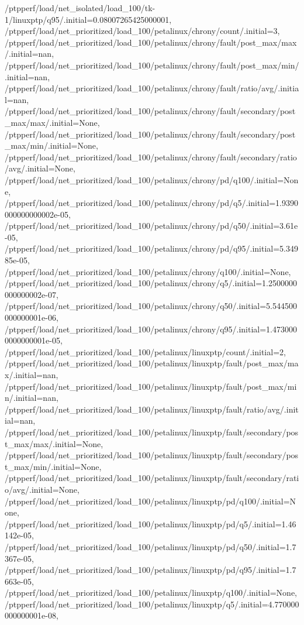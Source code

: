 {    /ptpperf/load/net_isolated/load_100/tk-1/linuxptp/q95/.initial=0.08007265425000001,
    /ptpperf/load/net_prioritized/load_100/petalinux/chrony/count/.initial=3,
    /ptpperf/load/net_prioritized/load_100/petalinux/chrony/fault/post_max/max/.initial=nan,
    /ptpperf/load/net_prioritized/load_100/petalinux/chrony/fault/post_max/min/.initial=nan,
    /ptpperf/load/net_prioritized/load_100/petalinux/chrony/fault/ratio/avg/.initial=nan,
    /ptpperf/load/net_prioritized/load_100/petalinux/chrony/fault/secondary/post_max/max/.initial=None,
    /ptpperf/load/net_prioritized/load_100/petalinux/chrony/fault/secondary/post_max/min/.initial=None,
    /ptpperf/load/net_prioritized/load_100/petalinux/chrony/fault/secondary/ratio/avg/.initial=None,
    /ptpperf/load/net_prioritized/load_100/petalinux/chrony/pd/q100/.initial=None,
    /ptpperf/load/net_prioritized/load_100/petalinux/chrony/pd/q5/.initial=1.9390000000000002e-05,
    /ptpperf/load/net_prioritized/load_100/petalinux/chrony/pd/q50/.initial=3.61e-05,
    /ptpperf/load/net_prioritized/load_100/petalinux/chrony/pd/q95/.initial=5.34985e-05,
    /ptpperf/load/net_prioritized/load_100/petalinux/chrony/q100/.initial=None,
    /ptpperf/load/net_prioritized/load_100/petalinux/chrony/q5/.initial=1.2500000000000002e-07,
    /ptpperf/load/net_prioritized/load_100/petalinux/chrony/q50/.initial=5.544500000000001e-06,
    /ptpperf/load/net_prioritized/load_100/petalinux/chrony/q95/.initial=1.4730000000000001e-05,
    /ptpperf/load/net_prioritized/load_100/petalinux/linuxptp/count/.initial=2,
    /ptpperf/load/net_prioritized/load_100/petalinux/linuxptp/fault/post_max/max/.initial=nan,
    /ptpperf/load/net_prioritized/load_100/petalinux/linuxptp/fault/post_max/min/.initial=nan,
    /ptpperf/load/net_prioritized/load_100/petalinux/linuxptp/fault/ratio/avg/.initial=nan,
    /ptpperf/load/net_prioritized/load_100/petalinux/linuxptp/fault/secondary/post_max/max/.initial=None,
    /ptpperf/load/net_prioritized/load_100/petalinux/linuxptp/fault/secondary/post_max/min/.initial=None,
    /ptpperf/load/net_prioritized/load_100/petalinux/linuxptp/fault/secondary/ratio/avg/.initial=None,
    /ptpperf/load/net_prioritized/load_100/petalinux/linuxptp/pd/q100/.initial=None,
    /ptpperf/load/net_prioritized/load_100/petalinux/linuxptp/pd/q5/.initial=1.46142e-05,
    /ptpperf/load/net_prioritized/load_100/petalinux/linuxptp/pd/q50/.initial=1.7367e-05,
    /ptpperf/load/net_prioritized/load_100/petalinux/linuxptp/pd/q95/.initial=1.7663e-05,
    /ptpperf/load/net_prioritized/load_100/petalinux/linuxptp/q100/.initial=None,
    /ptpperf/load/net_prioritized/load_100/petalinux/linuxptp/q5/.initial=4.770000000000001e-08,
}
